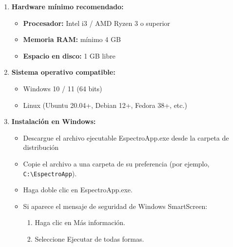 \documentclass[12pt]{article}
\begin{document}
    \begin{enumerate}
        \item \textbf{Hardware mínimo recomendado:}
        \begin{itemize}
            \item \textbf{Procesador:} Intel i3 / AMD Ryzen 3 o superior
            \item \textbf{Memoria RAM:} mínimo 4 GB
            \item \textbf{Espacio en disco:} 1 GB libre
        \end{itemize}
    
        \item \textbf{Sistema operativo compatible:}
        \begin{itemize}
            \item Windows 10 / 11 (64 bits)
            \item Linux (Ubuntu 20.04+, Debian 12+, Fedora 38+, etc.)
        \end{itemize}
    
        \item \textbf{Instalación en Windows:}
        \begin{itemize}
            \item Descargue el archivo ejecutable EspectroApp.exe desde la carpeta de distribución
            \item Copie el archivo a una carpeta de su preferencia (por ejemplo, \verb|C:\EspectroApp|).
            \item Haga doble clic en EspectroApp.exe.
            \item Si aparece el mensaje de seguridad de Windows SmartScreen:
                \begin{enumerate}
                    \item Haga clic en Más información.
                    \item Seleccione Ejecutar de todas formas.
                \end{enumerate}
        \end{itemize}
    

\end{enumerate}
\end{document}
